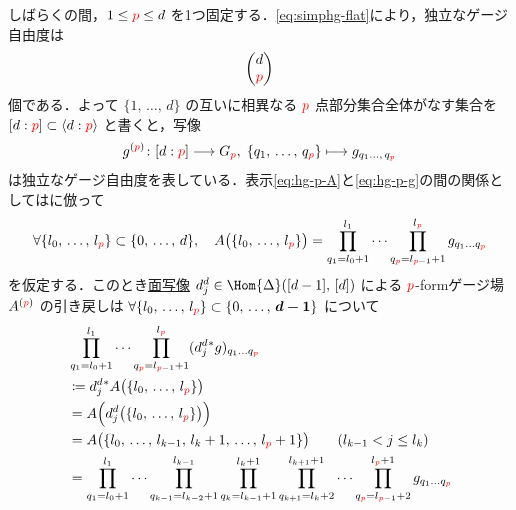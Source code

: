 \documentclass[TQFT_main]{subfiles}
\begin{document}
しばらくの間，$1 \le \textcolor{red}{p} \le d$ を1つ固定する．\eqref{eq:simphg-flat}により，独立なゲージ自由度は
\begin{align}
    \mqty(d \\ \textcolor{red}{p})
\end{align}
個である．よって $\{1,\, \dots,\, d\}$ の互いに相異なる $\textcolor{red}{p}$ 点部分集合全体がなす集合を $[d:\textcolor{red}{p}] \subset \expval{d:\textcolor{red}{p}}$ と書くと，写像
\begin{align}
    \label{eq:hg-p-g}
    g^{(\textcolor{red}{p})} \colon [d:\textcolor{red}{p}] \longrightarrow G_{\textcolor{red}{p}},\; \{q_1,\, \dots,\, q_{\textcolor{red}{p}}\} \longmapsto g_{q_1 \dots,\, q_{\textcolor{red}{p}}}
\end{align}
は独立なゲージ自由度を表している．表示\eqref{eq:hg-p-A}と\eqref{eq:hg-p-g}の間の関係としては\cite[p.8]{SChen2024anomaly}に倣って
\begin{align}
    \label{eq:hg-ansatz}
    \forall \{l_0,\, \dots,\, l_{\textcolor{red}{p}}\} \subset \{0,\, \dots,\, d\}, \quad
    A\bigl(\{l_0,\, \dots,\, l_{\textcolor{red}{p}}\}\bigr) = \prod_{q_1 = l_0+1}^{l_1} \cdots \prod_{q_{\textcolor{red}{p}} = l_{\textcolor{red}{p} - 1} + 1}^{l_{\textcolor{red}{p}}} g_{q_1\dots q_{\textcolor{red}{p}}}
\end{align}
を仮定する．このとき\hyperref[def:SimpSet]{面写像} $d^{d}_j \in \Hom{\Delta} ([d-1],\, [d])$ による $\textcolor{red}{p}$-formゲージ場 $A^{(\textcolor{red}{p})}$ の引き戻しは $\forall \{l_0,\, \dots,\, l_{\textcolor{red}{p}}\} \subset \{0,\, \dots,\, \bm{d-1}\}$ について
\begin{align}
    &\prod_{q_1 = l_0+1}^{l_1} \cdots \prod_{q_{\textcolor{red}{p}} = l_{\textcolor{red}{p} - 1} + 1}^{l_{\textcolor{red}{p}}} (d^d_j{}^* g)_{q_1\dots q_{\textcolor{red}{p}}} \\
    &\coloneqq d^{d}_j{}^* A \bigl(\{l_0,\, \dots,\, l_{\textcolor{red}{p}}\}\bigr) \\
    &= A \Bigl( d^{d}_j \bigl(\{l_0 ,\,\dots,\, l_{\textcolor{red}{p}}\}\bigr) \Bigr) \\
    &= A \bigl( \{l_0 ,\,\dots,\, l_{k-1},\, l_{k}+1 ,\,\dots,\, l_{\textcolor{red}{p}}+1\}  \bigr) \qquad (l_{k-1} < j \le l_k) \\
    &= \prod_{q_1 = l_0+1}^{l_1} \cdots \prod_{q_{k-1} = l_{k-2} + 1}^{l_{k-1}}\prod_{q_k = l_{k-1}+1}^{l_k + 1} \prod_{q_{k+1} = l_{k} + 2}^{l_{k+1} + 1} \cdots \prod_{q_{\textcolor{red}{p}} = l_{\textcolor{red}{p} - 1} + 2}^{l_{\textcolor{red}{p}}+1} g_{q_1 \dots q_{\textcolor{red}{p}}} \\
\end{align}
\end{document}
